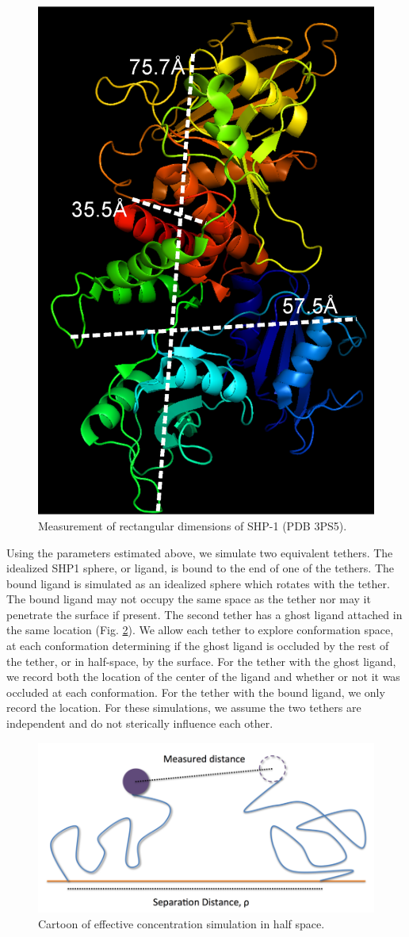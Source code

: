 \documentclass[../../AdvancementSummary.tex]{subfiles}
\begin{document}
\begin{figure}[H]
\begin{center}
\includegraphics[width=0.4\linewidth]{ResultsFigures/SHP1PyMol/LengthWidthDepth.eps}
\end{center}
\caption{Measurement of rectangular dimensions of SHP-1 (PDB 3PS5). \label{fig: SHP1Rectangle} }
\end{figure}

Using the parameters estimated above, we simulate two equivalent tethers. The idealized SHP1 sphere, or ligand, is bound to the end of one of the tethers. The bound ligand is simulated as an idealized sphere which rotates with the tether. The bound ligand may not occupy the same space as the tether nor may it penetrate the surface if present. The second tether has a ghost ligand attached in the same location (Fig. \ref{fig: LocalConcCartoon}). We allow each tether to explore conformation space, at each conformation determining if the ghost ligand is occluded by the rest of the tether, or in half-space, by the surface. For the tether with the ghost ligand, we record both the location of the center of the ligand and whether or not it was occluded at each conformation. For the tether with the bound ligand, we only record the location. For these simulations, we assume the two tethers are independent and do not sterically influence each other.

\begin{figure}
\includegraphics[width=\linewidth]{Diagram.png}
\caption{Cartoon of effective concentration simulation in half space. \label{fig: LocalConcCartoon}}
\end{figure}
\end{document}
